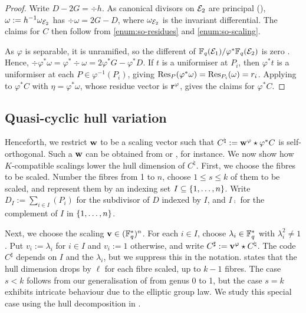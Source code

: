 \documentclass[twocolumn, 11pt]{scrartcl}
\begin{document}
\begin{proof}
    Write $D-2G=\div h$. As canonical divisors on $\mathcal{E}_2$ are principal (), $\omega:=h^{-1}\omega_{\mathcal{E}_2}$ has $\div\omega=2G-D$, where $\omega_{\mathcal{E}_2}$ is the invariant differential. The claims for $C$ then follow from \ref{enum:so-residues} and \ref{enum:so-scaling}.

    As $\varphi$ is separable, it is unramified, so the different of $\mathbb{F}_q(\mathcal{E}_1)/\varphi^*\mathbb{F}_q(\mathcal{E}_2)$ is zero \cite[\S3.4]{stichtenoth2009algebraic}. Hence, $\div\varphi^*\omega=\varphi^*\div\omega=2\varphi^*G-\varphi^*D$. If $t$ is a uniformiser at $P_i$, then $\varphi^*t$ is a uniformiser at each $P\in\varphi^{-1}(P_i)$, giving $\operatorname{Res}_P(\varphi^*\omega)=\operatorname{Res}_{P_i}(\omega)=r_i$. Applying  to $\varphi^*C$ with $\eta=\varphi^*\omega$, whose residue vector is $\mathbf{r}^\varphi$, gives the claims for $\varphi^*C$.
\end{proof}

\subsection{Quasi-cyclic hull variation} \label{subsection:qc-hv}

Henceforth, we restrict $\mathbf{w}$ to be a scaling vector such that $C^\natural:=\mathbf{w}^\varphi\star\varphi^*C$ is self-orthogonal. Such a $\mathbf{w}$ can be obtained from  or , for instance. We now show how $K$-compatible scalings lower the hull dimension of $C^\natural$. First, we choose the fibres to be scaled. Number the fibres from 1 to $n$, choose $1\leq s\leq k$ of them to be scaled, and represent them by an indexing set $I\subseteq\{1,\hdots,n\}$. Write $D_I:=\sum_{i\in I}(P_i)$ for the subdivisor of $D$ indexed by $I$, and $I\comp$ for the complement of $I$ in $\{1,\hdots,n\}$.

Next, we choose the scaling $\mathbf{v}\in(\mathbb{F}_q^*)^n$. For each $i\in I$, choose $\lambda_i\in\mathbb{F}_q^*$ with $\lambda_i^2\neq1$. Put $v_i:=\lambda_i$ for $i\in I$ and $v_i:=1$ otherwise, and write $C^\sharp:=\mathbf{v}^\varphi\star C^\natural$.
The code $C^\sharp$ depends on $I$ and the $\lambda_i$, but we suppress this in the notation.  states that the hull dimension drops by $\ell$ for each fibre scaled, up to $k-1$ fibres. The case $s<k$ follows from our generalisation of \cite[Thm.~1(i)]{fang2020euclidean} from genus 0 to 1, but the case $s=k$ exhibits intricate behaviour due to the elliptic group law. We study this special case using the hull decomposition in .
\end{document}
